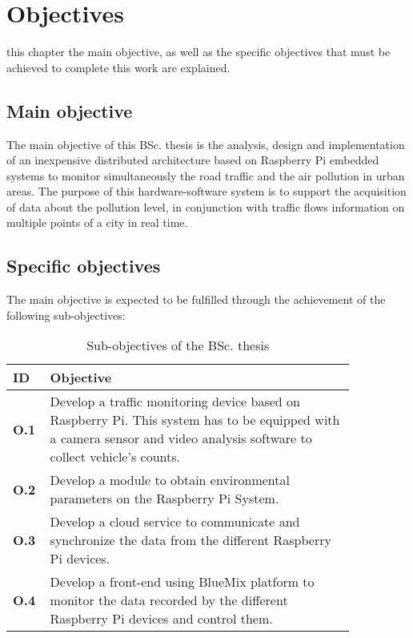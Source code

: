 \chapter{Objectives}
\label{chap:objectives}

 this chapter the main objective, as well as the specific objectives that must be achieved to complete this work are explained.

\section{Main objective}
The main objective of this \ac{BSc.} thesis is the analysis, design and implementation of an inexpensive distributed architecture based on Raspberry Pi embedded systems to monitor simultaneously the road traffic and the air pollution in urban areas. The purpose of this hardware-software system is to support the acquisition of data about the pollution level, in conjunction with traffic flows information on multiple points of a city in real time. 




\section{Specific objectives}
The main objective is expected to be fulfilled through the achievement of the following sub-objectives:

\begin{table}[!h]
	\centering
	\caption{Sub-objectives of the BSc. thesis}
	\label{tab:sub-objectives}
	
	\begin{tabular}{m{0.05\linewidth}m{0.8\linewidth}}
		\textbf{ID} & \textbf{Objective} \\
		\hline
		
		\textbf{O.1}& Develop a traffic monitoring device based on Raspberry Pi. This system has to be equipped with a camera sensor and video analysis software to collect vehicle’s counts.  \\
		
		\textbf{O.2}& Develop a module to obtain environmental parameters on the Raspberry Pi System.  \\
		
		\textbf{O.3}& Develop a cloud service to communicate and synchronize the data from the different Raspberry Pi devices.  \\
		
		\textbf{O.4}& Develop a front-end using BlueMix platform to monitor the data recorded by the different Raspberry Pi devices and control them.  \\
		
		\hline
	\end{tabular}
\end{table}

